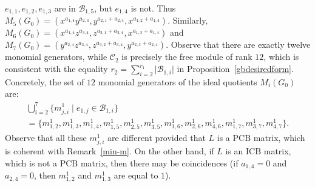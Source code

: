 \documentclass[ALCO]{cedram}
\newcommand{\mcb}{\mbox{$\mathcal{B}$}}
\newcommand{\mcc}{\mbox{$\mathcal{C}$}}
\newcommand{\icb}{\mbox{$\mathrm{ICB}$}}
\newcommand{\pcb}{\mbox{$\mathrm{PCB}$}}
\begin{document}
$e_{1,1},e_{1,2},e_{1,3}$ are in $\mcb_{1,5}$, but $e_{1,4}$ is
not. Thus
$M_5(G_0)=(x^{a_{1,4}}y^{a_{2,4}},y^{a_{2,1}+a_{2,4}},x^{a_{1,2}+a_{1,4}})$. Similarly,
$M_6(G_0)=(x^{a_{1,4}}z^{a_{3,4}},z^{a_{3,1}+a_{3,4}},x^{a_{1,3}+a_{1,4}})$
and
$M_7(G_0)=(y^{a_{2,4}}z^{a_{3,4}},z^{a_{3,2}+a_{3,4}},y^{a_{2,3}+a_{2,4}})$.
Observe that there are exactly twelve monomial generators, while
$\mcc_2$ is precisely the free module of rank $12$, which is
consistent with the equality
$r_2=\sum_{i=2}^{r_1}\lvert\mcb_{1,i}\rvert$ in
Proposition~\ref{gbdesiredform}. Concretely, the set of $12$ monomial
generators of the ideal quotients $M_i(G_0)$ are:
\begin{multline*} 
\bigcup_{i=2}^{7}\{m^1_{j,i}\mid e_{1,j}\in\mcb_{1,i}\}\\ =\{
  m^1_{1,2},m^1_{1,3},m^1_{1,4},m^1_{1,5},m^1_{2,5},m^1_{3,5},m^1_{1,6},m^1_{2,6},
  m^1_{4,6},m^1_{1,7},m^1_{3,7},m^1_{4,7}\}.
\end{multline*}
Observe that all these $m^1_{j,i}$ are different provided that $L$ is
a $\pcb$ matrix, which is coherent with Remark~\ref{min-m}. On the
other hand, if $L$ is an $\icb$ matrix, which is not a $\pcb$ matrix,
then there may be coincidences (\eg if $a_{1,4}=0$ and $a_{2,4}=0$,
then $m^1_{1,2}$ and $m^1_{1,3}$ are equal to $1$).
\end{document}
